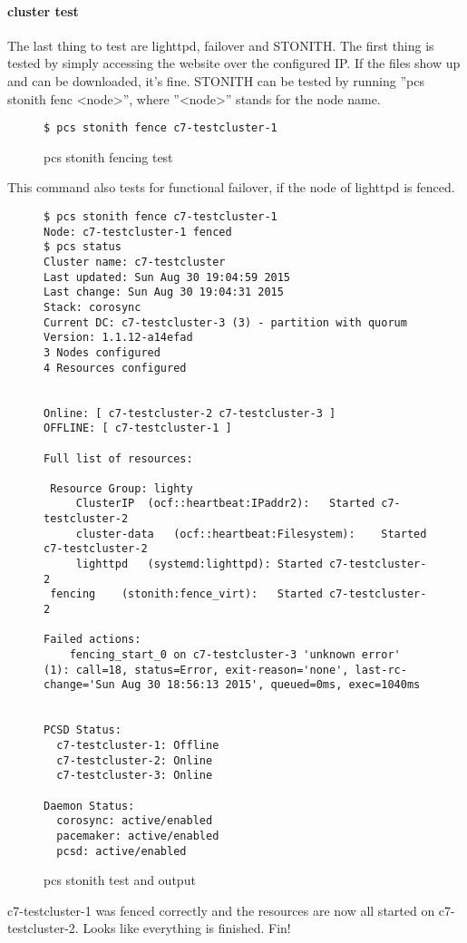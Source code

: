 \paragraph{cluster test}
The last thing to test are lighttpd, failover and \ac{STONITH}.
The first thing is tested by simply accessing the website over the configured IP.
If the files show up and can be downloaded, it's fine.
\ac{STONITH} can be tested by running ''pcs stonith fenc \textless node\textgreater'', where
''\textless node\textgreater'' stands for the node name.
\begin{figure}
\begin{lstlisting}
$ pcs stonith fence c7-testcluster-1
\end{lstlisting}
\caption{pcs stonith fencing test}
\end{figure}
This command also tests for functional failover, if the node of lighttpd is fenced.
\begin{figure}
\begin{lstlisting}
$ pcs stonith fence c7-testcluster-1
Node: c7-testcluster-1 fenced
$ pcs status
Cluster name: c7-testcluster
Last updated: Sun Aug 30 19:04:59 2015
Last change: Sun Aug 30 19:04:31 2015
Stack: corosync
Current DC: c7-testcluster-3 (3) - partition with quorum
Version: 1.1.12-a14efad
3 Nodes configured
4 Resources configured


Online: [ c7-testcluster-2 c7-testcluster-3 ]
OFFLINE: [ c7-testcluster-1 ]

Full list of resources:

 Resource Group: lighty
     ClusterIP	(ocf::heartbeat:IPaddr2):	Started c7-testcluster-2 
     cluster-data	(ocf::heartbeat:Filesystem):	Started c7-testcluster-2 
     lighttpd	(systemd:lighttpd):	Started c7-testcluster-2 
 fencing	(stonith:fence_virt):	Started c7-testcluster-2 

Failed actions:
    fencing_start_0 on c7-testcluster-3 'unknown error' (1): call=18, status=Error, exit-reason='none', last-rc-change='Sun Aug 30 18:56:13 2015', queued=0ms, exec=1040ms


PCSD Status:
  c7-testcluster-1: Offline
  c7-testcluster-2: Online
  c7-testcluster-3: Online

Daemon Status:
  corosync: active/enabled
  pacemaker: active/enabled
  pcsd: active/enabled
\end{lstlisting}
\caption{pcs stonith test and output}
\end{figure}
c7-testcluster-1 was fenced correctly and the resources are now all started on c7-testcluster-2.
Looks like everything is finished. Fin!

